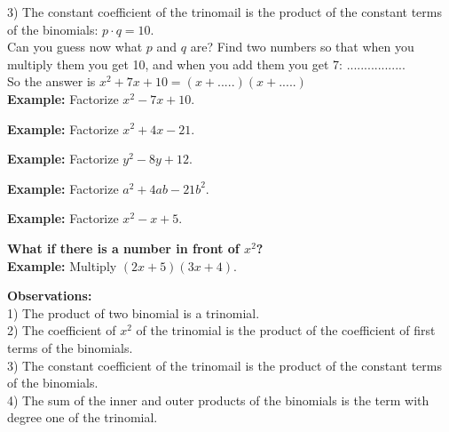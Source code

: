 \documentclass{ximera}
\begin{document}
3) The constant coefficient of the trinomail is the product of the constant terms of the binomials: $ p \cdot q = 10$.\\

Can you guess now what $p$ and $q$ are? Find two numbers so that when you multiply them you get 10, and when you add them you get 7: .................\\

So the answer is $x^2 + 7x +10 = (x + .....) (x + .....)$\\

\newpage
{\bf Example:} Factorize $x^2 - 7x +10 $.\\
\vspace{4 cm}

{\bf Example:} Factorize $x^2 + 4x -21 $.\\
\vspace{4 cm}

{\bf Example:} Factorize $y^2 - 8y +12$.\\
\vspace{4 cm}

{\bf Example:} Factorize $a^2 + 4ab -21b^2 $.\\
\vspace{4 cm}

{\bf Example:} Factorize $x^2 -x +5$.\\
\vspace{4 cm}

{\bf What if there is a number in front of $x^2$?}\\

{\bf Example:} Multiply $(2x+5)(3x+4)$.\\
\vspace{2 cm}



{\bf Observations:}\\

1) The product of two binomial is a trinomial.\\

2) The coefficient of $x^2$ of the trinomial is the product of the coefficient of first terms of the binomials.\\

3) The constant coefficient of the trinomail is the product of the constant terms of the binomials.\\

4) The sum of the inner and outer products of the binomials is the term with degree one of the trinomial.\\ 
\end{document}
